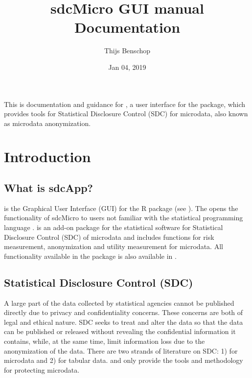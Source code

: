 \documentclass[letterpaper,10pt,english]{sphinxmanual}
\title{sdcMicro GUI manual Documentation}
\date{Jan 04, 2019}
\author{Thijs Benschop}
\begin{document}
\maketitle
\sphinxtableofcontents
{}\label{\detokenize{index::doc}}


This is documentation and guidance for , a user interface for the  
package, which provides tools for Statistical Disclosure Control (SDC) for microdata,
also known as microdata anonymization.


\chapter{Introduction}
\label{\detokenize{introduction::doc}}\label{\detokenize{introduction:introduction}}\label{\detokenize{introduction:sdcapp-manual}}

\section{What is sdcApp?}
\label{\detokenize{introduction:what-is-sdcapp}}
 is the Graphical User Interface (GUI) for the R package  (see
). The 
opens the functionality of sdcMicro to users not familiar with the statistical
programming language .  is an add-on package for the statistical software 
for Statistical Disclosure Control (SDC) of microdata and includes functions for risk measurement,
anonymization and utility measurement for
microdata. All functionality available in the  package is also available in .


\section{Statistical Disclosure Control (SDC)}
\label{\detokenize{introduction:statistical-disclosure-control-sdc}}
A large part of the data collected by statistical agencies cannot be published directly
due to privacy and confidentiality concerns. These concerns are both of legal and ethical
nature. SDC seeks to treat and alter the data so that the data can be published or
released without revealing the confidential information it contains, while, at the same time,
limit information loss due to the anonymization of the data. There are two strands of literature
on SDC: 1) for microdata and 2) for tabular data.  and  only provide the tools
and methodology for protecting microdata.
\end{document}
